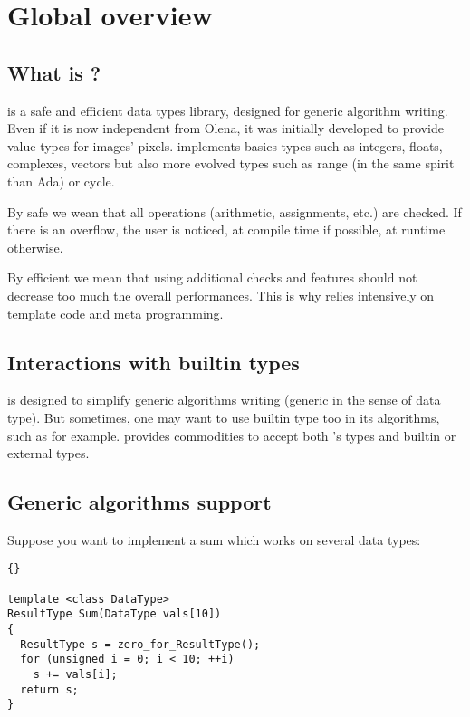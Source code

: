 \section{Global overview}

\subsection{What is {\integre} ?}

{\integre} is a safe and efficient data types library, designed for
generic algorithm writing. Even if it is now independent from Olena,
it was initially developed to provide value types for images'
pixels. {\integre} implements basics types such as integers, floats,
complexes, vectors but also more evolved types such as range (in the
same spirit than Ada) or cycle.

By safe we wean that all operations (arithmetic, assignments, etc.)
are checked. If there is an overflow, the user is noticed, at compile
time if possible, at runtime otherwise.

By efficient we mean that using {\integre} additional checks and
features should not decrease too much the overall performances. This
is why {\integre} relies intensively on template code and meta
programming.

\subsection{Interactions with builtin types}

{\integre} is designed to simplify generic algorithms writing (generic
in the sense of data type). But sometimes, one may want to use builtin
type too in its algorithms, such as  for example. {\integre}
provides commodities to accept both {\integre}'s types and builtin or
external types.

\subsection{Generic algorithms support}

Suppose you want to implement a sum which works on several data types:


\begin{lstlisting}{}

template <class DataType>
ResultType Sum(DataType vals[10])
{
  ResultType s = zero_for_ResultType();
  for (unsigned i = 0; i < 10; ++i)
    s += vals[i];
  return s;
}

\end{lstlisting}

